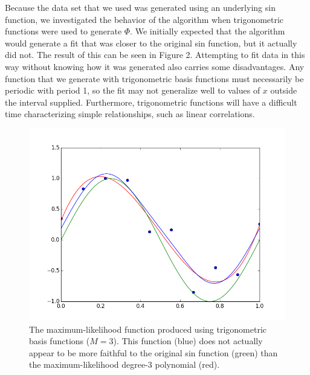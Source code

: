 \documentclass{article}
\begin{document}
Because the data set that we used was generated using an underlying sin function, we investigated the behavior of the algorithm when trigonometric functions were used to generate $\Phi$. We initially expected that the algorithm would generate a fit that was closer to the original sin function, but it actually did not. The result of this can be seen in Figure 2. Attempting to fit data in this way without knowing how it was generated also carries some disadvantages. Any function that we generate with trigonometric basis functions must necessarily be periodic with period 1, so the fit may not generalize well to values of $x$ outside the interval supplied. Furthermore, trigonometric functions will have a difficult time characterizing simple relationships, such as linear correlations.

\begin{figure}
\includegraphics[scale=0.4]{figure2_3.png}
\caption{The maximum-likelihood function produced using trigonometric basis functions ($M=3$). This function (blue) does not actually appear to be more faithful to the original sin function (green) than the maximum-likelihood degree-3 polynomial (red).}
\end{figure}
\end{document}
